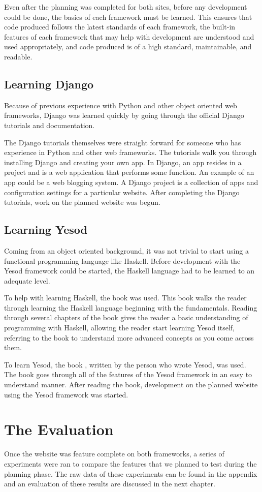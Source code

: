 Even after the planning was completed for both sites, before any development could
be done, the basics of each framework must be learned. This ensures that code
produced follows the latest standards of each framework, the built-in features
of each framework that may help with development are understood and used appropriately,
and code produced is of a high standard, maintainable, and readable.

\subsection{Learning Django}

Because of previous experience with Python and other object oriented web frameworks, 
Django was learned quickly by going through the official Django tutorials and 
documentation.

The Django tutorials themselves were straight forward for someone who has 
experience in Python and other web frameworks. The tutorials walk you through
installing Django and creating your own app. In Django, an app resides in a project
and is a web application that performs some function. An example of an app could be
a web blogging system. A Django project is a collection of apps and configuration
settings for a particular website. After completing the Django tutorials, work
on the planned website was begun. \parencite{djangoIntroDocs}

\subsection{Learning Yesod}

Coming from an object oriented background, it was not trivial to start using
a functional programming language like Haskell. Before development with the
Yesod framework could be started, the Haskell language had to be learned to
an adequate level.

To help with learning Haskell, the book  \parencite{haskellBook}
was used. This book walks the reader through learning the Haskell language beginning
with the fundamentals. Reading through several chapters of the book gives
the reader a basic understanding of programming with Haskell, allowing the reader
start learning Yesod itself, referring to the book to understand more
advanced concepts as you come across them.

To learn Yesod, the book  \parencite{yesodBook}, 
written by the person who wrote Yesod, was used. The book goes through all of the
features of the Yesod framework in an easy to understand manner. After
reading the book, development on the planned website using the Yesod
framework was started.

\section{The Evaluation}

Once the website was feature complete on both frameworks, a series of experiments
were ran to compare the features that we planned to test during the planning phase.
The raw data of these experiments can be found in the appendix and an evaluation
of these results are discussed in the next chapter.

